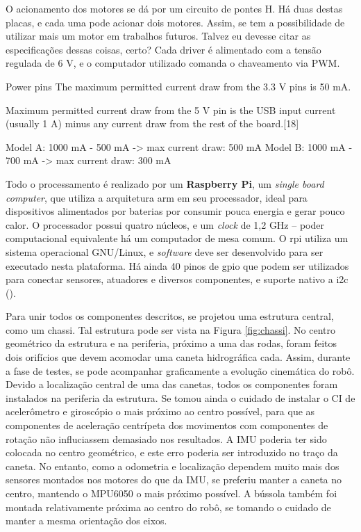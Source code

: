 O acionamento dos motores se dá por um circuito de pontes H. Há duas destas placas, e cada uma pode acionar dois motores. Assim, se tem a possibilidade de utilizar mais um motor em trabalhos futuros. Talvez eu devesse citar as especificações dessas coisas, certo? Cada driver é alimentado com a tensão regulada de 6 V, e o computador utilizado comanda o chaveamento via PWM.

Power pins
The maximum permitted current draw from the 3.3 V pins is 50 mA.

Maximum permitted current draw from the 5 V pin is the USB input current (usually 1 A) minus any current draw from the rest of the board.[18]

Model A: 1000 mA - 500 mA -> max current draw: 500 mA
Model B: 1000 mA - 700 mA -> max current draw: 300 mA

Todo o processamento é realizado por um \textbf{Raspberry Pi}, um \emph{single board computer}, que utiliza a arquitetura \acrshort{arm} em seu processador, ideal para dispositivos alimentados por baterias por consumir pouca energia e gerar pouco calor. O processador possui quatro núcleos, e um \emph{clock} de 1,2 GHz -- poder computacional equivalente há um computador de mesa comum. O \acrshort{rpi} utiliza um sistema operacional GNU/Linux, e \emph{software} deve ser desenvolvido para ser executado nesta plataforma. Há ainda 40 pinos de \acrshort{gpio} que podem ser utilizados para conectar sensores, atuadores e diversos componentes, e suporte nativo a \acrshort{i2c} (\cite{upton2014raspberry}).

Para unir todos os componentes descritos, se projetou uma estrutura central, como um chassi. Tal estrutura pode ser vista na Figura \ref{fig:chassi}. No centro geométrico da estrutura e na periferia, próximo a uma das rodas, foram feitos dois orifícios que devem acomodar uma caneta hidrográfica cada. Assim, durante a fase de testes, se pode acompanhar graficamente a evolução cinemática do robô. Devido a localização central de uma das canetas, todos os componentes foram instalados na periferia da estrutura. Se tomou ainda o cuidado de instalar o CI de acelerômetro e giroscópio o mais próximo ao centro possível, para que as componentes de aceleração centrípeta dos movimentos com componentes de rotação não influciassem demasiado nos resultados. A IMU poderia ter sido colocada no centro geométrico, e este erro poderia ser introduzido no traço da caneta. No entanto, como a odometria e localização dependem muito mais dos sensores montados nos motores do que da IMU, se preferiu manter a caneta no centro, mantendo o MPU6050 o mais próximo possível. A bússola também foi montada relativamente próxima ao centro do robô, se tomando o cuidado de manter a mesma orientação dos eixos.

